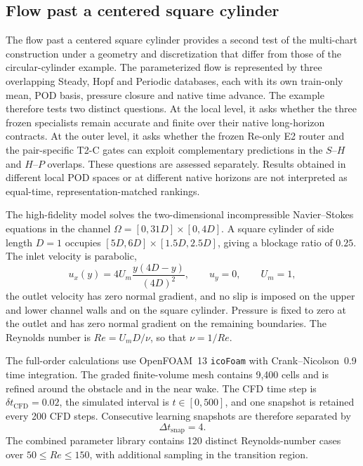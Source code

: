 
\subsection{Flow past a centered square cylinder}
\label{subsec:flow_past_centered_square_cylinder}

The flow past a centered square cylinder provides a second test of the
multi-chart construction under a geometry and discretization that differ
from those of the circular-cylinder example.  The parameterized flow is
represented by three overlapping Steady, Hopf and Periodic databases, each
with its own train-only mean, POD basis, pressure closure and native time
advance.  The example therefore tests two distinct questions.  At the local
level, it asks whether the three frozen specialists remain accurate and
finite over their native long-horizon contracts.  At the outer level, it asks
whether the frozen Re-only E2 router and the pair-specific T2-C gates can
exploit complementary predictions in the $S$--$H$ and $H$--$P$ overlaps.
These questions are assessed separately.  Results obtained in different
local POD spaces or at different native horizons are not interpreted as
equal-time, representation-matched rankings.

The high-fidelity model solves the two-dimensional incompressible
Navier--Stokes equations in the channel
$\Omega=[0,31D]\times[0,4D]$.  A square cylinder of side length $D=1$
occupies $[5D,6D]\times[1.5D,2.5D]$, giving a blockage ratio of $0.25$.
The inlet velocity is parabolic,
\begin{equation}
  u_x(y)=4U_m\frac{y(4D-y)}{(4D)^2},
  \qquad u_y=0,
  \qquad U_m=1,
  \label{eq:centered_square_inlet}
\end{equation}
the outlet velocity has zero normal gradient, and no slip is imposed on the
upper and lower channel walls and on the square cylinder.  Pressure is fixed
to zero at the outlet and has zero normal gradient on the remaining
boundaries.  The Reynolds number is $Re=U_mD/\nu$, so that $\nu=1/Re$.

The full-order calculations use OpenFOAM~13 \texttt{icoFoam} with
Crank--Nicolson~0.9 time integration.  The graded finite-volume mesh contains
9,400 cells and is refined around the obstacle and in the near wake.  The CFD
time step is $\delta t_{\mathrm{CFD}}=0.02$, the simulated interval is
$t\in[0,500]$, and one snapshot is retained every 200 CFD steps.  Consecutive
learning snapshots are therefore separated by
\begin{equation}
  \Delta t_{\mathrm{snap}}=4 .
  \label{eq:centered_square_snapshot_dt}
\end{equation}
The combined parameter library contains 120 distinct Reynolds-number cases
over $50\le Re\le150$, with additional sampling in the transition region.

